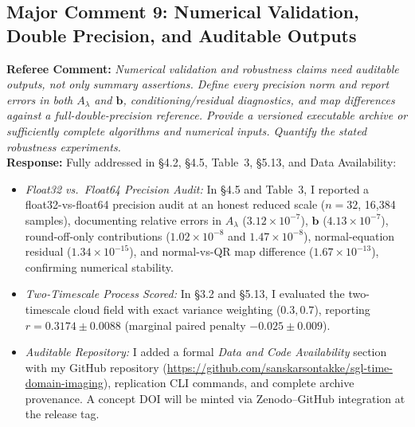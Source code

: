 \documentclass[11pt]{article}
\begin{document}
\subsection*{Major Comment 9: Numerical Validation, Double Precision, and Auditable Outputs}
\textbf{Referee Comment:} \textit{Numerical validation and robustness claims need auditable outputs, not only summary assertions. Define every precision norm and report errors in both $A_\lambda$ and $\mathbf{b}$, conditioning/residual diagnostics, and map differences against a full-double-precision reference. Provide a versioned executable archive or sufficiently complete algorithms and numerical inputs. Quantify the stated robustness experiments.}\\
\textbf{Response:} Fully addressed in §4.2, §4.5, Table~3, §5.13, and Data Availability:
\begin{itemize}
    \item \textit{Float32 vs.\ Float64 Precision Audit:} In §4.5 and Table~3, I reported a float32-vs-float64 precision audit at an honest reduced scale ($n=32$, 16,384 samples), documenting relative errors in $A_\lambda$ ($3.12\times 10^{-7}$), $\mathbf{b}$ ($4.13\times 10^{-7}$), round-off-only contributions ($1.02\times 10^{-8}$ and $1.47\times 10^{-8}$), normal-equation residual ($1.34\times 10^{-15}$), and normal-vs-QR map difference ($1.67\times 10^{-13}$), confirming numerical stability.
    \item \textit{Two-Timescale Process Scored:} In §3.2 and §5.13, I evaluated the two-timescale cloud field with exact variance weighting ($0.3, 0.7$), reporting $r = 0.3174 \pm 0.0088$ (marginal paired penalty $-0.025 \pm 0.009$).
    \item \textit{Auditable Repository:} I added a formal \textit{Data and Code Availability} section with my GitHub repository (\url{https://github.com/sanskarsontakke/sgl-time-domain-imaging}), replication CLI commands, and complete archive provenance. A concept DOI will be minted via Zenodo--GitHub integration at the release tag.
\end{itemize}
\end{document}
